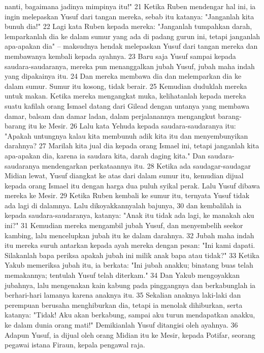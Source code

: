 \begin{biblechapter}
nanti, bagaimana jadinya mimpinya itu!" 21 Ketika Ruben mendengar hal ini, ia ingin melepaskan Yusuf dari tangan mereka, sebab itu katanya: "Janganlah kita bunuh dia!" 22 Lagi kata Ruben kepada mereka: "Janganlah tumpahkan darah, lemparkanlah dia ke dalam sumur yang ada di padang gurun ini, tetapi janganlah apa-apakan dia" -- maksudnya hendak melepaskan Yusuf dari tangan mereka dan membawanya kembali kepada ayahnya. 23 Baru saja Yusuf sampai kepada saudara-saudaranya, mereka pun menanggalkan jubah Yusuf, jubah maha indah yang dipakainya itu. 24 Dan mereka membawa dia dan melemparkan dia ke dalam sumur. Sumur itu kosong, tidak berair. 25 Kemudian duduklah mereka untuk makan. Ketika mereka mengangkat muka, kelihatanlah kepada mereka suatu kafilah orang Ismael datang dari Gilead dengan untanya yang membawa damar, balsam dan damar ladan, dalam perjalanannya mengangkut barang-barang itu ke Mesir. 26 Lalu kata Yehuda kepada saudara-saudaranya itu: "Apakah untungnya kalau kita membunuh adik kita itu dan menyembunyikan darahnya? 27 Marilah kita jual dia kepada orang Ismael ini, tetapi janganlah kita apa-apakan dia, karena ia saudara kita, darah daging kita." Dan saudara-saudaranya mendengarkan perkataannya itu. 28 Ketika ada saudagar-saudagar Midian lewat, Yusuf diangkat ke atas dari dalam sumur itu, kemudian dijual kepada orang Ismael itu dengan harga dua puluh syikal perak. Lalu Yusuf dibawa mereka ke Mesir. 29 Ketika Ruben kembali ke sumur itu, ternyata Yusuf tidak ada lagi di dalamnya. Lalu dikoyakkannyalah bajunya, 30 dan kembalilah ia kepada saudara-saudaranya, katanya: "Anak itu tidak ada lagi, ke manakah aku ini?" 31 Kemudian mereka mengambil jubah Yusuf, dan menyembelih seekor kambing, lalu mencelupkan jubah itu ke dalam darahnya. 32 Jubah maha indah itu mereka suruh antarkan kepada ayah mereka dengan pesan: "Ini kami dapati. Silakanlah bapa periksa apakah jubah ini milik anak bapa atau tidak?" 33 Ketika Yakub memeriksa jubah itu, ia berkata: "Ini jubah anakku; binatang buas telah memakannya; tentulah Yusuf telah diterkam." 34 Dan Yakub mengoyakkan jubahnya, lalu mengenakan kain kabung pada pinggangnya dan berkabunglah ia berhari-hari lamanya karena anaknya itu. 35 Sekalian anaknya laki-laki dan perempuan berusaha menghiburkan dia, tetapi ia menolak dihiburkan, serta katanya: "Tidak! Aku akan berkabung, sampai aku turun mendapatkan anakku, ke dalam dunia orang mati!" Demikianlah Yusuf ditangisi oleh ayahnya. 36 Adapun Yusuf, ia dijual oleh orang Midian itu ke Mesir, kepada Potifar, seorang pegawai istana Firaun, kepala pengawal raja.
\end{biblechapter}

